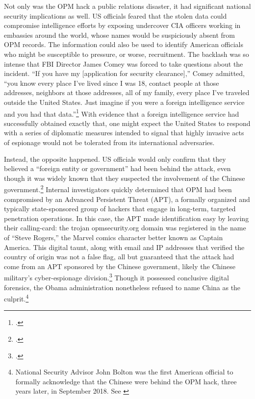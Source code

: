 \documentclass[14pt]{extarticle}
\begin{document}
Not only was the OPM hack a public relations disaster, it had significant national security implications as well. US officials feared that the stolen data could compromise intelligence efforts by exposing undercover CIA officers working in embassies around the world, whose names would be suspiciously absent from OPM records. The information could also be used to identify American officials who might be susceptible to pressure, or worse, recruitment. The backlash was so intense that FBI Director James Comey was forced to take questions about the incident. \enquote{If you have my [application for security clearance],} Comey admitted, ``you know every place I've lived since I was 18, contact people at those addresses, neighbors at those addresses, all of my family, every place I've traveled outside the United States. Just imagine if you were a foreign intelligence service and you had that data.''\footcite{nakashima_hacks_2015} With evidence that a foreign intelligence service had successfully obtained exactly that, one might expect the United States to respond with a series of diplomatic measures intended to signal that highly invasive acts of espionage would not be tolerated from its international adversaries.

Instead, the opposite happened. US officials would only confirm that they believed a \enquote{foreign entity or government} had been behind the attack, even though it was widely known that they suspected the involvement of the Chinese government.\footcite{spetalnick_china_2015} Internal investigators quickly determined that OPM had been compromised by an Advanced Persistent Threat (APT), a formally organized and typically state-sponsored group of hackers that engage in long-term, targeted penetration operations. In this case, the APT made identification easy by leaving their calling-card: the trojan opmsecurity.org domain was registered in the name of \enquote{Steve Rogers,} the Marvel comics character better known as Captain America. This digital taunt, along with email and IP addresses that verified the country of origin was not a false flag, all but guaranteed that the attack had come from an APT sponsored by the Chinese government, likely the Chinese military's cyber-espionage division.\footcite{koerner_inside_2016} Though it possessed conclusive digital forensics, the Obama administration nonetheless refused to name China as the culprit.\footnote{National Security Advisor John Bolton was the first American official to formally acknowledge that the Chinese were behind the OPM hack, three years later, in September 2018. See \cite{sanger_trump_2018}}
\end{document}
